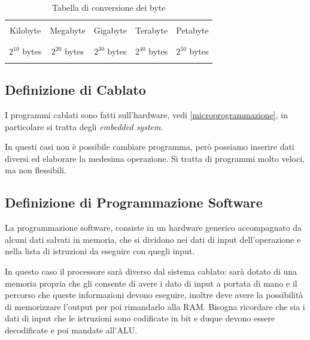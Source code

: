 \documentclass{article}
\begin{document}
\begin{table}[h]
	\centering
	\begin{tabular}{|c|c|c|c|c|}
		\hline
		  &  &  &  &  \\
		Kilobyte & Megabyte & Gigabyte & Terabyte & Petabyte \\
		  &  &  &  &  \\
		\hline
		  &  &  &  &  \\
		$2^{10}$ bytes & $2^{20}$ bytes & $2^{30}$ bytes & $2^{40}$ bytes & $2^{50}$ bytes \\
		  &  &  &  &  \\
		\hline
	\end{tabular}
	\caption{Tabella di conversione dei byte}
\end{table}

\subsection{Definizione di Cablato}
	I programmi cablati sono fatti sull'hardware, vedi \autoref{microprogrammazione}, in particolare si tratta degli \textit{embedded system}.

In questi casi non è possibile cambiare programma, però possiamo inserire dati diversi ed elaborare la medesima operazione. Si tratta di programmi molto veloci, ma non flessibili.

\subsection{Definizione di Programmazione Software}

La programmazione software, consiste in un hardware generico accompagnato da alcuni dati salvati in memoria, che si dividono nei dati di input dell'operazione e nella lista di istruzioni da eseguire con quegli input.



In questo caso il processore sarà diverso dal sistema cablato: sarà dotato di una memoria propria che gli consente di avere i dato di input a portata di mano e il percorso che queste informazioni devono eseguire, inoltre deve avere la possibilità di memorizzare l'output per poi rimandarlo alla RAM. Bisogna ricordare che sia i dati di input che le istruzioni sono codificate in bit e duque devono essere decodificate e poi mandate all'ALU.
\end{document}
